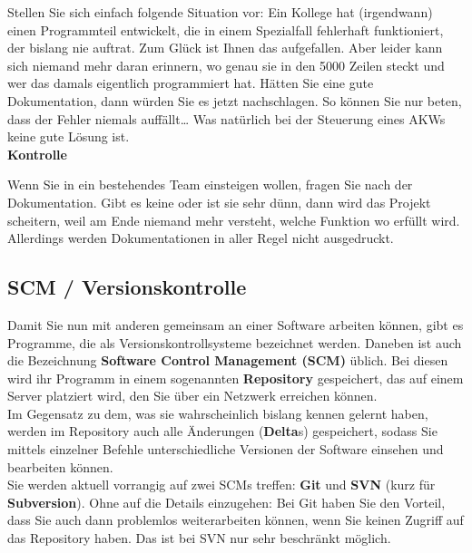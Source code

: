 Stellen Sie sich einfach folgende Situation vor: Ein Kollege hat (irgendwann) einen Programmteil entwickelt, die in einem Spezialfall fehlerhaft funktioniert, der bislang nie auftrat. Zum Glück ist Ihnen das aufgefallen. Aber leider kann sich niemand mehr daran erinnern, wo genau sie in den 5000 Zeilen steckt und wer das damals eigentlich programmiert hat. Hätten Sie eine gute Dokumentation, dann würden Sie es jetzt nachschlagen. So können Sie nur beten, dass der Fehler niemals auffällt… Was natürlich bei der Steuerung eines AKWs keine gute Lösung ist.\\

\textbf{Kontrolle}

Wenn Sie in ein bestehendes Team einsteigen wollen, fragen Sie nach der Dokumentation. Gibt es keine oder ist sie sehr dünn, dann wird das Projekt scheitern, weil am Ende niemand mehr versteht, welche Funktion wo erfüllt wird. Allerdings werden Dokumentationen in aller Regel nicht ausgedruckt.

\subsection{SCM / Versionskontrolle}

Damit Sie nun mit anderen gemeinsam an einer Software arbeiten können, gibt es Programme, die als Versionskontrollsysteme bezeichnet werden. Daneben ist auch die Bezeichnung \textbf{Software Control Management (SCM)} üblich. Bei diesen wird ihr Programm in einem sogenannten \textbf{Repository} gespeichert, das auf einem Server platziert wird, den Sie über ein Netzwerk erreichen können.\\

Im Gegensatz zu dem, was sie wahrscheinlich bislang kennen gelernt haben, werden im Repository auch alle Änderungen (\textbf{Delta}s) gespeichert, sodass Sie mittels einzelner Befehle unterschiedliche Versionen der Software einsehen und bearbeiten können.\\

Sie werden aktuell vorrangig auf zwei SCMs treffen: \textbf{Git} und \textbf{SVN} (kurz für \textbf{Subversion}). Ohne auf die Details einzugehen: Bei Git haben Sie den Vorteil, dass Sie auch dann problemlos weiterarbeiten können, wenn Sie keinen Zugriff auf das Repository haben. Das ist bei SVN nur sehr beschränkt möglich.\\

